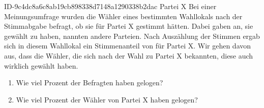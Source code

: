 \begin{exercise}
      {ID-9c4dc8a6c8ab19cb898338d7148a1290338b2dac}
      {Partei X}
  \ifproblem\problem
    Bei einer Meinungsumfrage wurden die Wähler eines bestimmten Wahllokals
    nach der Stimmabgabe befragt, ob sie für Partei X gestimmt hätten.
    Dabei gaben  an, sie gewählt zu haben,  nannten andere
    Parteien. Nach Auszählung der Stimmen ergab sich in diesem Wahllokal
    ein Stimmenanteil von  für Partei X. Wir gehen davon aus,
    dass die Wähler, die sich nach der Wahl zu Partei X bekannten,
    diese auch wirklich gewählt haben.
    \begin{enumerate}
      \item Wie viel Prozent der Befragten haben gelogen?
      \item Wie viel Prozent der Wähler von Partei X haben gelogen?
    \end{enumerate}
  \fi
\end{exercise}
